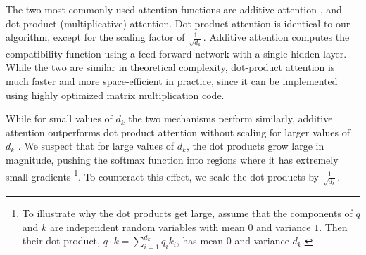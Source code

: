 The two most commonly used attention functions are additive attention
\citep{bahdanau2014neural}, and dot-product (multiplicative) attention.
Dot-product attention is identical to our algorithm, except for the scaling
factor of $\frac{1}{\sqrt{d_k}}$. Additive attention computes the compatibility
function using a feed-forward network with a single hidden layer.  While the
two are similar in theoretical complexity, dot-product attention is much faster
and more space-efficient in practice, since it can be implemented using highly
optimized matrix multiplication code.




While for small values of $d_k$ the two mechanisms perform similarly, additive
attention outperforms dot product attention without scaling for larger values
of $d_k$ \citep{DBLP:journals/corr/BritzGLL17}. We suspect that for large
values of $d_k$, the dot products grow large in magnitude, pushing the softmax
function into regions where it has extremely small gradients  \footnote{To
  illustrate why the dot products get large, assume that the components of $q$
  and $k$ are independent random variables with mean $0$ and variance $1$.  Then
  their dot product, $q \cdot k = \sum_{i=1}^{d_k} q_ik_i$, has mean $0$ and
  variance $d_k$.}. To counteract this effect, we scale the dot products by
$\frac{1}{\sqrt{d_k}}$.


